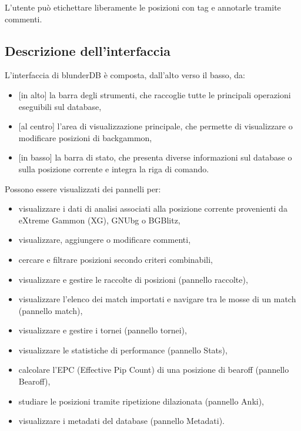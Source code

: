 \documentclass[letterpaper,10pt,italian]{sphinxmanual}
\begin{document}
\sphinxAtStartPar
L’utente può etichettare liberamente le posizioni con tag e annotarle tramite commenti.


\subsection{Descrizione dell’interfaccia}
\label{\detokenize{manuel:description-de-l-interface}}
\sphinxAtStartPar
L’interfaccia di blunderDB è composta, dall’alto verso il basso, da:
\begin{itemize}
\item {} 
\sphinxAtStartPar
{[}in alto{]} la barra degli strumenti, che raccoglie tutte le principali operazioni eseguibili sul database,

\item {} 
\sphinxAtStartPar
{[}al centro{]} l’area di visualizzazione principale, che permette di visualizzare o modificare posizioni di backgammon,

\item {} 
\sphinxAtStartPar
{[}in basso{]} la barra di stato, che presenta diverse informazioni sul database o sulla posizione corrente e integra la riga di comando.

\end{itemize}

\sphinxAtStartPar
Possono essere visualizzati dei pannelli per:
\begin{itemize}
\item {} 
\sphinxAtStartPar
visualizzare i dati di analisi associati alla posizione corrente provenienti da eXtreme Gammon (XG), GNUbg o BGBlitz,

\item {} 
\sphinxAtStartPar
visualizzare, aggiungere o modificare commenti,

\item {} 
\sphinxAtStartPar
cercare e filtrare posizioni secondo criteri combinabili,

\item {} 
\sphinxAtStartPar
visualizzare e gestire le raccolte di posizioni (pannello raccolte),

\item {} 
\sphinxAtStartPar
visualizzare l’elenco dei match importati e navigare tra le mosse di un match (pannello match),

\item {} 
\sphinxAtStartPar
visualizzare e gestire i tornei (pannello tornei),

\item {} 
\sphinxAtStartPar
visualizzare le statistiche di performance (pannello Stats),

\item {} 
\sphinxAtStartPar
calcolare l’EPC (Effective Pip Count) di una posizione di bearoff (pannello Bearoff),

\item {} 
\sphinxAtStartPar
studiare le posizioni tramite ripetizione dilazionata (pannello Anki),

\item {} 
\sphinxAtStartPar
visualizzare i metadati del database (pannello Metadati).

\end{itemize}
\end{document}
